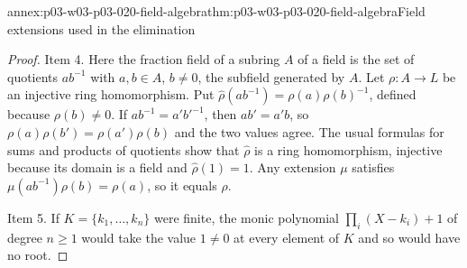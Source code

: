 \begin{annexitem}{annex:p03-w03-p03-020-field-algebra}{thm:p03-w03-p03-020-field-algebra}{Field extensions used in the elimination}
\begin{proof}
Item 4. Here the fraction field of a subring \(A\) of a field is the set of
quotients \(ab^{-1}\) with \(a,b\in A\), \(b\ne0\), the subfield
generated by \(A\). Let \(\rho:A\to L\) be an injective ring homomorphism.
Put \(\hat\rho(ab^{-1})=\rho(a)\rho(b)^{-1}\), defined because
\(\rho(b)\ne0\). If \(ab^{-1}=a'b'^{-1}\), then \(ab'=a'b\), so
\(\rho(a)\rho(b')=\rho(a')\rho(b)\) and the two values agree. The usual
formulas for sums and products of quotients show that \(\hat\rho\) is a ring
homomorphism, injective because its domain is a field and
\(\hat\rho(1)=1\). Any extension \(\mu\) satisfies
\(\mu(ab^{-1})\rho(b)=\rho(a)\), so it equals \(\hat\rho\).

Item 5. If \(K=\{k_1,\ldots,k_n\}\) were finite, the monic polynomial
\(\prod_i(X-k_i)+1\) of degree \(n\ge1\) would take the value \(1\ne0\) at
every element of \(K\) and so would have no root.
\end{proof}
\end{annexitem}

